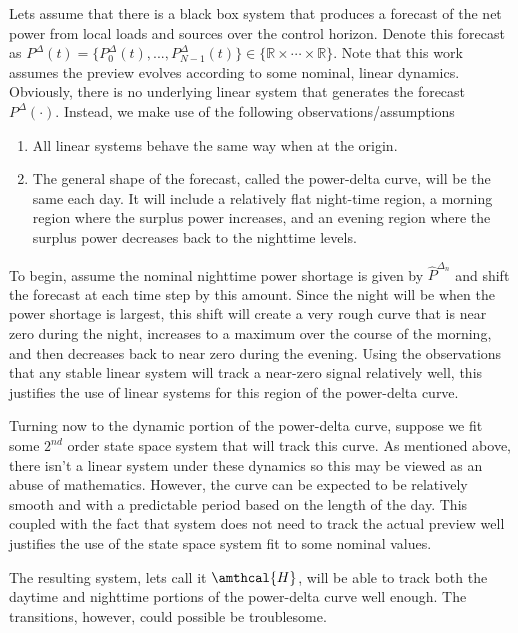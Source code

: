 \documentclass{article}
\begin{document}


Lets assume that there is a black box system that produces a forecast of the net power from local loads and sources over the control horizon. Denote this forecast as $P^\Delta(t)=\{P^\Delta_0(t),...,P^\Delta_{N-1}(t)\}\in\{\mathbb{R}\times\cdots\times\mathbb{R}\}$. Note that this work assumes the preview evolves according to some nominal, linear dynamics. Obviously, there is no underlying linear system that generates the forecast $P^\Delta(\cdot)$. Instead, we make use of the following observations/assumptions
\begin{enumerate}
    \item All linear systems behave the same way when at the origin.
    \item The general shape of the forecast, called the power-delta curve, will be the same each day. It will include a relatively flat night-time region, a morning region where the surplus power increases, and an evening region where the surplus power decreases back to the nighttime levels.
\end{enumerate}

To begin, assume the nominal nighttime power shortage is given by $\hat{P}^{\Delta_n}$ and shift the forecast at each time step by this amount. Since the night will be when the power shortage is largest, this shift will create a very rough curve that is near zero during the night, increases to a maximum over the course of the morning, and then decreases back to near zero during the evening. Using the observations that any stable linear system will track a near-zero signal relatively well, this justifies the use of linear systems for this region of the power-delta curve. 

Turning now to the dynamic portion of the power-delta curve, suppose we fit some $2^{nd}$ order state space system that will track this curve. As mentioned above, there isn't a linear system under these dynamics so this may be viewed as an abuse of mathematics. However, the curve can be expected to be relatively smooth and with a predictable period based on the length of the day. This coupled with the fact that system does not need to track the actual preview well justifies the use of the state space system fit to some nominal values.

The resulting system, lets call it $\amthcal{H}$, will be able to track both the daytime and nighttime portions of the power-delta curve well enough. The transitions, however, could possible be troublesome. 
\end{document}
